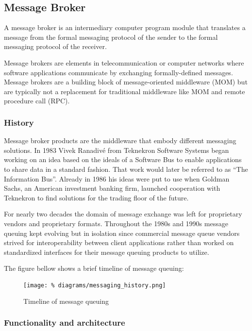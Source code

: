 \subsection{Message Broker}
\label{s_message_broker}

A message broker is an intermediary computer program module
that translates a message from the formal messaging
protocol of the sender to the formal messaging protocol of
the receiver.

Message brokers are elements in telecommunication or
computer networks where software applications communicate
by exchanging formally-defined messages. Message brokers
are a building block of message-oriented middleware (MOM)
but are typically not a replacement for traditional
middleware like MOM and remote procedure call (RPC).
\cite{amjad27}

\subsubsection{History}

Message broker products are the middleware that embody
different messaging solutions. In 1983 Vivek Ranadivé from
Teknekron Software Systems began working on an idea based
on the ideals of a Software Bus to enable applications to
share data in a standard fashion. That work would later be
referred to as “The Information Bus”. Already in 1986 his
ideas were put to use when Goldman Sachs, an American
investment banking firm, launched cooperation with
Teknekron to find solutions for the trading floor of the
future.\cite{amjad28}

For nearly two decades the domain of message exchange was
left for proprietary vendors and proprietary formats.
Throughout the 1980s and 1990s message queuing kept
evolving but in isolation since commercial message queue
vendors strived for interoperability between client
applications rather than worked on standardized interfaces
for their message queuing products to utilize.
\cite{amjad28}


The figure bellow shows a brief timeline of message queuing:

\begin{figure}[H]
  \centering
  \texttt{[image: \%
    diagrams/messaging\_history.png]}
  \caption{Timeline of message queuing}
\end{figure}

\subsubsection{Functionality and architecture}
\label{ss_mb_faa}

